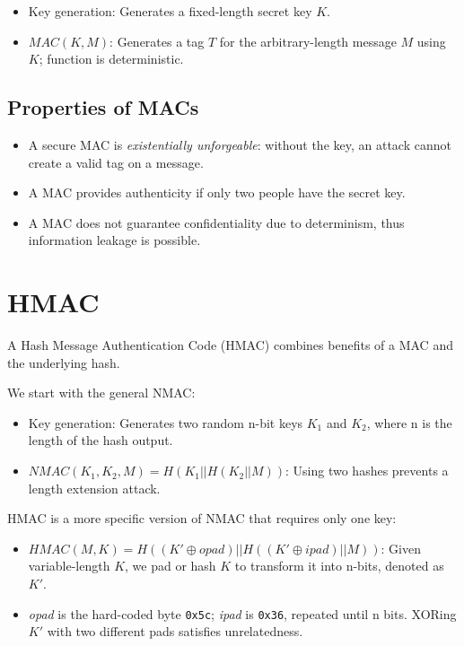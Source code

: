 \begin{itemize}
    \item Key generation: Generates a fixed-length secret key $K$.
    \item $MAC(K, M)$: Generates a tag $T$ for the arbitrary-length message $M$ using $K$; function is deterministic.
\end{itemize}

\subsection{Properties of MACs}
\begin{itemize}
    \item A secure MAC is \emph{existentially unforgeable}: without the key, an attack cannot create a valid tag on a message.
    \item A MAC provides authenticity if only two people have the secret key.
    \item A MAC does not guarantee confidentiality due to determinism, thus information leakage is possible.
\end{itemize}

\section{HMAC}
A Hash Message Authentication Code (HMAC) combines benefits of a MAC and the underlying hash. 

\medskip

We start with the general NMAC:
\begin{itemize}
    \item Key generation: Generates two random n-bit keys $K_1$ and $K_2$, where n is the length of the hash output.
    \item $NMAC(K_1, K_2, M) = H(K_1 || H(K_2 || M))$: Using two hashes prevents a length extension attack.
\end{itemize}

\medskip

HMAC is a more specific version of NMAC that requires only one key:

\begin{itemize}
    \item $HMAC(M, K) = H((K' \oplus \textit{opad}) || H((K' \oplus \textit{ipad}) || M))$: Given variable-length $K$, we pad or hash $K$ to transform it into n-bits, denoted as $K'$.
    \item \textit{opad} is the hard-coded byte \texttt{0x5c}; \textit{ipad} is \texttt{0x36}, repeated until n bits. XORing $K'$ with two different pads satisfies unrelatedness.
\end{itemize}

